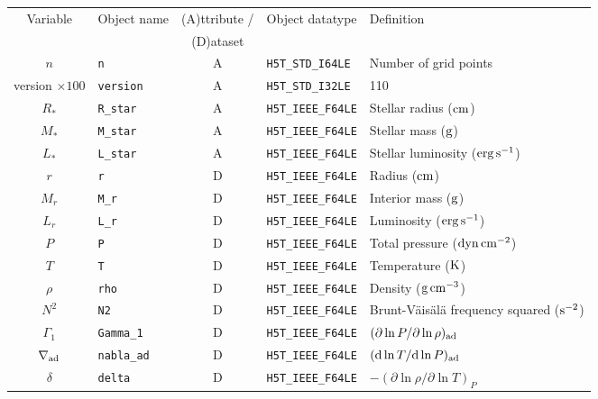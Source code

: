 \documentclass{article}
\newcommand{\diff}{\ensuremath{{\rm d}}}
\newcommand{\Rstar}{\ensuremath{R_{\ast}}}
\newcommand{\Mstar}{\ensuremath{M_{\ast}}}
\newcommand{\Lstar}{\ensuremath{L_{\ast}}}
\newcommand{\cm}{\ensuremath{{\rm cm}}}
\newcommand{\gram}{\ensuremath{{\rm g}}}
\newcommand{\second}{\ensuremath{{\rm s}}}
\newcommand{\dyne}{\ensuremath{{\rm dyn}}}
\newcommand{\erg}{\ensuremath{{\rm erg}}}
\newcommand{\kelvin}{\ensuremath{{\rm K}}}
\begin{document}
\begin{table}[h!]
\begin{tabular}{|c|l|c|l|l|} \hline
Variable & Object name & (A)ttribute / & Object datatype & Definition \\
&             & (D)ataset     &                 &            \\ \hline
$n$               & \texttt{n}            & A &\texttt{H5T\_STD\_I64LE}  & Number of grid points \\ 
version $\times 100$ & \texttt{version}   & A & \texttt{H5T\_STD\_I32LE}  & 110 \\
\Rstar            & \texttt{R\_star}      & A & \texttt{H5T\_IEEE\_F64LE} & Stellar radius ($\cm$) \\
\Mstar            & \texttt{M\_star}      & A & \texttt{H5T\_IEEE\_F64LE} & Stellar mass ($\gram$) \\
\Lstar            & \texttt{L\_star}      & A & \texttt{H5T\_IEEE\_F64LE} & Stellar luminosity ($\erg\,\second^{-1}$) \\
$r$               & \texttt{r}            & D & \texttt{H5T\_IEEE\_F64LE} & Radius ($\cm$) \\
$M_{r}$           & \texttt{M\_r}            & D & \texttt{H5T\_IEEE\_F64LE} & Interior mass ($\gram$) \\
$L_{r}$           & \texttt{L\_r}         & D & \texttt{H5T\_IEEE\_F64LE} & Luminosity ($\erg\,\second^{-1}$) \\
$P$               & \texttt{P}            & D & \texttt{H5T\_IEEE\_F64LE} & Total pressure ($\dyne\,\cm^{-2}$) \\
$T$               & \texttt{T}            & D & \texttt{H5T\_IEEE\_F64LE} & Temperature ($\kelvin$) \\
$\rho$            & \texttt{rho}          & D & \texttt{H5T\_IEEE\_F64LE} & Density ($\gram\,\cm^{-3}$) \\
$N^{2}$           & \texttt{N2}           & D & \texttt{H5T\_IEEE\_F64LE} & Brunt-V\"ais\"al\"a frequency squared ($\second^{-2}$) \\
$\Gamma_{1}$      & \texttt{Gamma\_1}      & D & \texttt{H5T\_IEEE\_F64LE} & $(\partial \ln P/\partial \ln \rho)_{\rm ad}$ \\
$\nabla_{\rm ad}$  & \texttt{nabla\_ad}      & D & \texttt{H5T\_IEEE\_F64LE} & $(\diff \ln T/\diff \ln P)_{\rm ad}$ \\
$\delta$          & \texttt{delta}            & D & \texttt{H5T\_IEEE\_F64LE} & $-(\partial \ln \rho/\partial \ln T)_{P}$  \\

\end{tabular}
\end{table}
\end{document}

